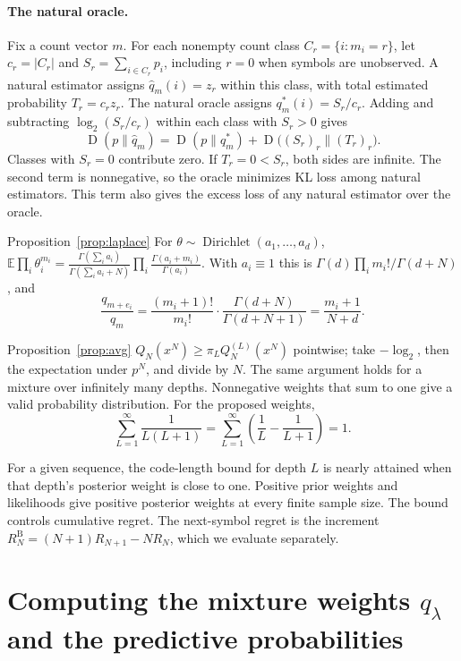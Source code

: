 \documentclass[anon]{alt2027}
\newcommand{\batchreg}{R^{\mathrm{B}}}
\newcommand{\Dir}{\operatorname{Dirichlet}}
\newcommand{\E}{\mathbb{E}}
\newcommand{\KL}{\operatorname{D}}
\begin{document}
\paragraph{The natural oracle.}
Fix a count vector $m$. For each nonempty count class $C_r=\{i:m_i=r\}$, let $c_r=|C_r|$ and $S_r=\sum_{i\in C_r}p_i$, including $r=0$ when symbols are unobserved. A natural estimator assigns $\hat q_m(i)=z_r$ within this class, with total estimated probability $T_r=c_rz_r$. The natural oracle assigns $q^*_m(i)=S_r/c_r$. Adding and subtracting $\log_2(S_r/c_r)$ within each class with $S_r>0$ gives
\begin{equation}
\KL(p\|\hat q_m)=\KL(p\|q^*_m)+\KL\bigl((S_r)_r\big\|(T_r)_r\bigr).
\end{equation}
Classes with $S_r=0$ contribute zero. If $T_r=0<S_r$, both sides are infinite. The second term is nonnegative, so the oracle minimizes KL loss among natural estimators. This term also gives the excess loss of any natural estimator over the oracle.

\begin{proofof}{Proposition~\ref{prop:laplace}}
For $\theta\sim\Dir(a_1,\dots,a_d)$, $\E\prod_i\theta_i^{m_i}=\frac{\Gamma(\sum_ia_i)}{\Gamma(\sum_i a_i+N)}\prod_i\frac{\Gamma(a_i+m_i)}{\Gamma(a_i)}$. With $a_i\equiv1$ this is $\Gamma(d)\prod_im_i!/\Gamma(d+N)$, and \[\frac{q_{m+e_i}}{q_m}=\frac{(m_i+1)!}{m_i!}\cdot\frac{\Gamma(d+N)}{\Gamma(d+N+1)}=\frac{m_i+1}{N+d}.\]
\end{proofof}

\begin{proofof}{Proposition~\ref{prop:avg}}
$Q_N(x^N)\ge\pi_LQ^{(L)}_N(x^N)$ pointwise; take $-\log_2$, then the expectation under $p^N$, and divide by $N$. The same argument holds for a mixture over infinitely many depths. Nonnegative weights that sum to one give a valid probability distribution. For the proposed weights, \[\sum_{L=1}^{\infty}\frac{1}{L(L+1)}=\sum_{L=1}^{\infty}\left(\frac1L-\frac1{L+1}\right)=1.\]
\end{proofof}
For a given sequence, the code-length bound for depth $L$ is nearly attained when that depth's posterior weight is close to one. Positive prior weights and likelihoods give positive posterior weights at every finite sample size. The bound controls cumulative regret. The next-symbol regret is the increment $\batchreg_N=(N+1)R_{N+1}-NR_N$, which we evaluate separately.

\section{Computing the mixture weights \texorpdfstring{$q_\lambda$}{q-of-lambda}
 and the predictive probabilities}
\label{app:qlambda}
\end{document}
